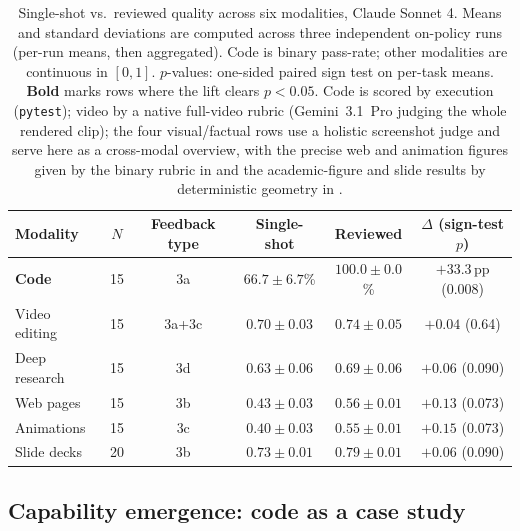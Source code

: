 \documentclass[11pt]{article}
\begin{document}
\begin{table}[t]
\centering
\caption{Single-shot vs.\ reviewed quality across six modalities, Claude Sonnet 4. Means and standard deviations are computed across three independent on-policy runs (per-run means, then aggregated). Code is binary pass-rate; other modalities are continuous in $[0,1]$. $p$-values: one-sided paired sign test on per-task means. \textbf{Bold} marks rows where the lift clears $p < 0.05$. Code is scored by execution (\texttt{pytest}); video by a native full-video rubric (Gemini~3.1~Pro judging the whole rendered clip); the four visual/factual rows use a holistic screenshot judge and serve here as a cross-modal overview, with the precise web and animation figures given by the binary rubric in  and the academic-figure and slide results by deterministic geometry in .}
\label{tab:harness-headline}
\small
\begin{tabular}{lccccc}
\toprule
Modality & $N$ & Feedback type & Single-shot & Reviewed & $\Delta$ (sign-test $p$) \\
\midrule
\textbf{Code}          & 15 & 3a       & $66.7 \pm 6.7$\%   & $\mathbf{100.0 \pm 0.0}$\% & $\mathbf{+33.3}$\,pp (0.008) \\
Video editing          & 15 & 3a+3c    & $0.70 \pm 0.03$    & $0.74 \pm 0.05$   & $+0.04$ (0.64) \\
Deep research          & 15 & 3d       & $0.63 \pm 0.06$    & $0.69 \pm 0.06$   & $+0.06$ (0.090) \\
Web pages              & 15 & 3b       & $0.43 \pm 0.03$    & $0.56 \pm 0.01$   & $+0.13$ (0.073) \\
Animations             & 15 & 3c       & $0.40 \pm 0.03$    & $0.55 \pm 0.01$   & $+0.15$ (0.073) \\
Slide decks            & 20 & 3b       & $0.73 \pm 0.01$    & $0.79 \pm 0.01$   & $+0.06$ (0.090) \\
\bottomrule
\end{tabular}
\end{table}

\subsection{Capability emergence: code as a case study}
\label{sec:harness-emergence}
\end{document}
